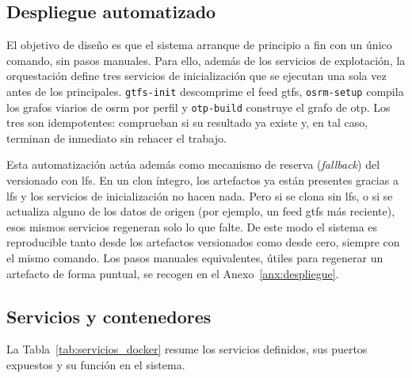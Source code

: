 \subsection{Despliegue automatizado}

El objetivo de diseño es que el sistema arranque de principio a fin con un único comando, sin pasos manuales. Para ello, además de los servicios de explotación, la orquestación define tres servicios de inicialización que se ejecutan una sola vez antes de los principales. \texttt{gtfs-init} descomprime el feed \gls{gtfs}, \texttt{osrm-setup} compila los grafos viarios de \gls{osrm} por perfil y \texttt{otp-build} construye el grafo de \gls{otp}. Los tres son idempotentes: comprueban si su resultado ya existe y, en tal caso, terminan de inmediato sin rehacer el trabajo.
\newpage

Esta automatización actúa además como mecanismo de reserva (\textit{fallback}) del versionado con \gls{lfs}. En un clon íntegro, los artefactos ya están presentes gracias a \gls{lfs} y los servicios de inicialización no hacen nada. Pero si se clona sin \gls{lfs}, o si se actualiza alguno de los datos de origen (por ejemplo, un feed \gls{gtfs} más reciente), esos mismos servicios regeneran solo lo que falte. De este modo el sistema es reproducible tanto desde los artefactos versionados como desde cero, siempre con el mismo comando. Los pasos manuales equivalentes, útiles para regenerar un artefacto de forma puntual, se recogen en el Anexo~\ref{anx:despliegue}.

\subsection{Servicios y contenedores}

La Tabla~\ref{tab:servicios_docker} resume los servicios definidos, sus puertos expuestos y su función en el sistema. %

